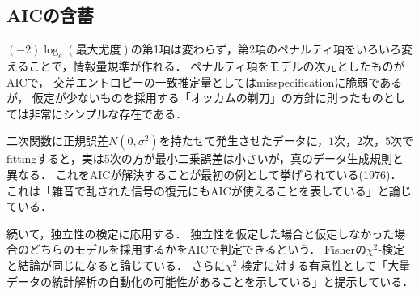 \documentclass[uplatex,dvipdfmx]{jsreport}
\begin{document}
\subsection{AICの含蓄}

\begin{tcolorbox}[colframe=ForestGreen, colback=ForestGreen!10!white,breakable,colbacktitle=ForestGreen!40!white,coltitle=black,fonttitle=\bfseries\sffamily,
title=]
    $(-2)\log_e(\text{最大尤度})$の第1項は変わらず，第2項のペナルティ項をいろいろ変えることで，情報量規準が作れる．
    ペナルティ項をモデルの次元としたものがAICで，
    交差エントロピーの一致推定量としてはmisspecificationに脆弱であるが，
    仮定が少ないものを採用する「オッカムの剃刀」の方針に則ったものとしては非常にシンプルな存在である．
\end{tcolorbox}

\begin{discussion}
    二次関数に正規誤差$N(0,\sigma^2)$を持たせて発生させたデータに，$1$次，$2$次，$5$次でfittingすると，実は5次の方が最小二乗誤差は小さいが，真のデータ生成規則と異なる．
    これをAICが解決することが最初の例として挙げられている(1976\cite{赤池76})．
    これは「雑音で乱された信号の復元にもAICが使えることを表している」と論じている．

    続いて，独立性の検定に応用する．
    独立性を仮定した場合と仮定しなかった場合のどちらのモデルを採用するかをAICで判定できるという．
    Fisherの$\chi^2$-検定と結論が同じになると論じている．
    さらに$\chi^2$-検定に対する有意性として「大量データの統計解析の自動化の可能性があることを示している」と提示している．
\end{discussion}
\end{document}
